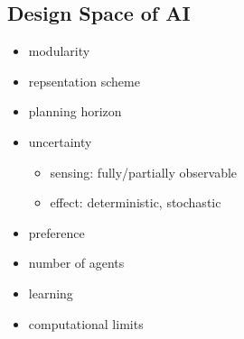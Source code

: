 \documentclass[]{article}
\theoremstyle{definition}
\begin{document}
	\subsection{Design Space of AI}
	\begin{itemize}
		\item modularity
		\item repsentation scheme
		\item planning horizon
		\item uncertainty
			\begin{itemize}
				\item sensing: fully/partially observable
				\item effect: deterministic, stochastic
			\end{itemize}
		\item preference
		\item number of agents
		\item learning
		\item computational limits
	\end{itemize}
\end{document}
